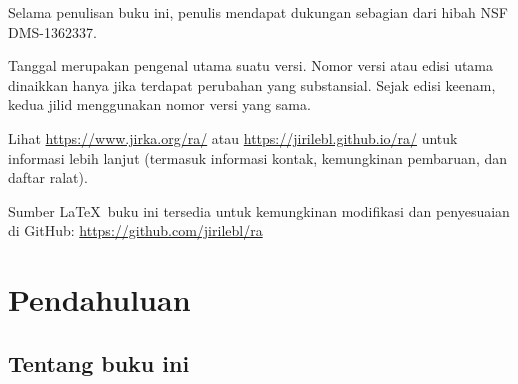 \documentclass[12pt]{book}
\newcommand{\ignore}[1]{}
\theoremstyle{plain}
\theoremstyle{remark}
\theoremstyle{definition}
\theoremstyle{exercise}
\theoremstyle{example}
\begin{document}
\bigskip

\noindent
Selama penulisan buku ini, penulis mendapat dukungan sebagian dari hibah NSF
DMS-1362337.

\bigskip

\noindent
Tanggal merupakan pengenal utama suatu versi. Nomor versi atau edisi utama
dinaikkan hanya jika terdapat perubahan yang substansial. Sejak edisi keenam,
kedua jilid menggunakan nomor versi yang sama.

\bigskip

\noindent
Lihat \url{https://www.jirka.org/ra/} atau \url{https://jirilebl.github.io/ra/}
untuk informasi lebih lanjut (termasuk informasi kontak, kemungkinan
pembaruan, dan daftar ralat).


\bigskip

\noindent
Sumber \LaTeX\ buku ini tersedia untuk kemungkinan modifikasi dan penyesuaian
di GitHub: \url{https://github.com/jirilebl/ra}



\tableofcontents
{}

\newpage


\chapter*{Pendahuluan}


\section*{Tentang buku ini}




\end{document}
